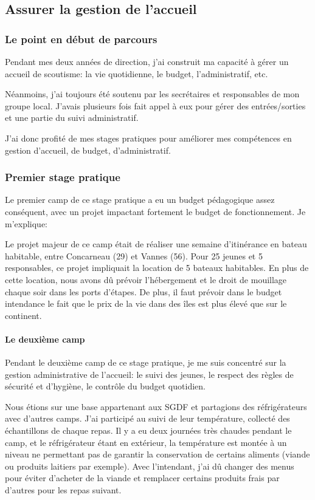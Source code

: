 \documentclass[titlepage,11pt,a4paper]{article}
\begin{document}
\subsection{Assurer la gestion de l'accueil}

\subsubsection{Le point en début de parcours}

Pendant mes deux années de direction, j'ai construit ma capacité à gérer un accueil de
scoutisme: la vie quotidienne, le budget, l'administratif, etc.

Néanmoins, j'ai toujours été soutenu par les secrétaires et responsables de mon groupe
local. J'avais plusieurs fois fait appel à eux pour gérer des entrées/sorties et une
partie du suivi administratif.

J'ai donc profité de mes stages pratiques pour améliorer mes compétences en gestion
d'accueil, de budget, d'administratif.

\subsubsection{Premier stage pratique}

Le premier camp de ce stage pratique a eu un budget pédagogique assez conséquent, avec un
projet impactant fortement le budget de fonctionnement. Je m'explique:

Le projet majeur de ce camp était de réaliser une semaine d'itinérance en bateau
habitable, entre Concarneau (29) et Vannes (56). Pour 25 jeunes et 5 responsables, ce
projet impliquait la location de 5 bateaux habitables. En plus de cette location, nous
avons dû prévoir l'hébergement et le droit de mouillage chaque soir dans les ports d'étapes.
De plus, il faut prévoir dans le budget intendance le fait que le prix de la vie dans des
îles est plus élevé que sur le continent. %

\paragraph{Le deuxième camp}

Pendant le deuxième camp de ce stage pratique, je me suis concentré sur la gestion
administrative de l'accueil: le suivi des jeunes, le respect des règles de sécurité et
d'hygiène, le contrôle du budget quotidien.

Nous étions sur une base appartenant aux SGDF et partagions des réfrigérateurs avec
d'autres camps. J'ai participé au suivi de leur température, collecté des échantillons de
chaque repas. Il y a eu deux journées très chaudes pendant le camp, et le réfrigérateur
étant en extérieur, la température est montée à un niveau ne permettant pas de garantir la
conservation de certains aliments (viande ou produits laitiers par exemple). Avec l'intendant, j'ai dû
changer des menus pour éviter d'acheter de la viande et remplacer certains produits frais
par d'autres pour les repas suivant.
\end{document}
